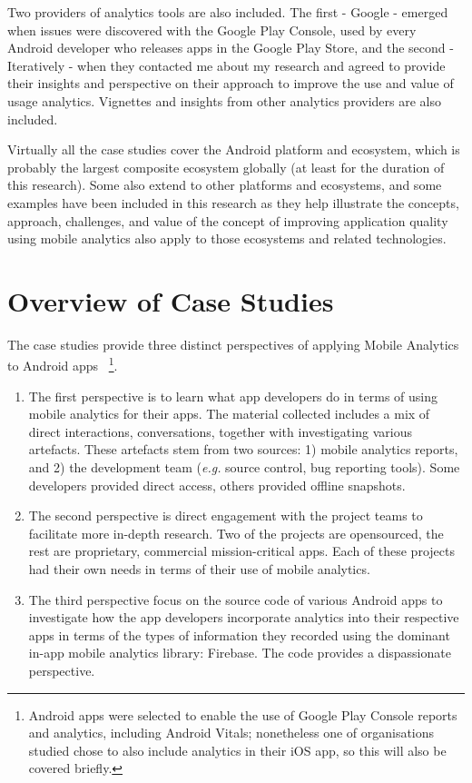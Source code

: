 Two providers of analytics tools are also included. The first - Google - emerged when issues were discovered with the Google Play Console, used by every Android developer who releases apps in the Google Play Store, and the second - Iteratively - when they contacted me about my research and agreed to provide their insights and perspective on their approach to improve the use and value of usage analytics. Vignettes and insights from other analytics providers are also included. 

Virtually all the case studies cover the Android platform and ecosystem, which is probably the largest composite ecosystem globally (at least for the duration of this research). Some also extend to other platforms and ecosystems, and some examples have been included in this research as they help illustrate the concepts, approach, challenges, and value of the concept of improving application quality using mobile analytics also apply to those ecosystems and related technologies.



\clearpage
\section{Overview of Case Studies}
\label{section-overview-of-case-studies}

The case studies provide three distinct perspectives of applying Mobile Analytics to Android apps
~\footnote{Android apps were selected to enable the use of Google Play Console reports and analytics, including Android Vitals; nonetheless one of organisations studied chose to also include analytics in their iOS app, so this will also be covered briefly.}.

\begin{enumerate}
    \item The first perspective is to learn what app developers do in terms of using mobile analytics for their apps. The material collected includes a mix of direct interactions, conversations, together with investigating various artefacts. These artefacts stem from two sources: 1) mobile analytics reports, and 2) the development team (\emph{e.g.} source control, bug reporting tools). Some developers provided direct access, others provided offline snapshots.
    \item The second perspective is direct engagement with the project teams to facilitate more in-depth research. Two of the projects are opensourced, the rest are proprietary, commercial mission-critical apps. Each of these projects had their own needs in terms of their use of mobile analytics.  
    \item The third perspective focus on the source code of various Android apps to investigate how the app developers incorporate analytics into their respective apps in terms of the types of information they recorded using the dominant in-app mobile analytics library: Firebase. The code provides a dispassionate perspective.
\end{enumerate}

